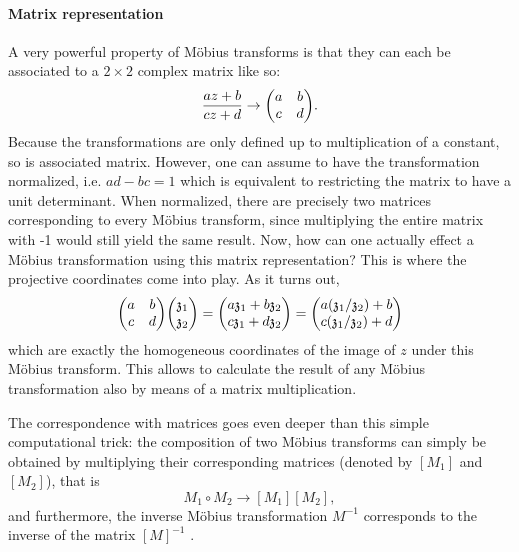 \paragraph{Matrix representation}
A very powerful property of Möbius transforms is that they can each be associated to a \(2\times 2\) complex matrix like so:
\[ \frac{az + b}{cz + d} \rightarrow \mqty(a & b \\ c & d).\] 
Because the transformations are only defined up to multiplication of a constant, so is associated matrix. However, one can assume to have the transformation normalized, i.e. \(ad - bc = 1\) which is equivalent to restricting the matrix to have a unit determinant.  When normalized, there are precisely two matrices corresponding to every Möbius transform, since multiplying the entire matrix with -1 would still yield the same result. Now, how can one actually effect a Möbius transformation using this matrix representation? This is where the projective coordinates come into play. As it turns out, 
\[ 
    \mqty(a & b\\ c & d)\mqty(\mathfrak{z}_1\\\mathfrak{z}_2)
    = \mqty(a\mathfrak{z}_1 + b\mathfrak{z}_2\\c\mathfrak{z}_1 + d\mathfrak{z}_2)
    =\mqty(a(\mathfrak{z}_1/\mathfrak{z}_2) + b\\c(\mathfrak{z}_1/\mathfrak{z}_2) + d)
\]
which are exactly the homogeneous coordinates of the image of \(z\) under this Möbius transform. This allows to calculate the result of any Möbius transformation also by means of a matrix multiplication.

The correspondence with matrices goes even deeper than this simple computational trick: the composition of two Möbius transforms  can simply be obtained by multiplying their corresponding matrices (denoted by \([M_1]\) and \([M_2]\)), that is
\[M_1 \circ M_2 \to [M_1][M_2],\]
and furthermore, the inverse Möbius transformation \(M^{-1}\) corresponds to the inverse of the matrix \([M]^{-1}\) \cite{Needham2021}.



